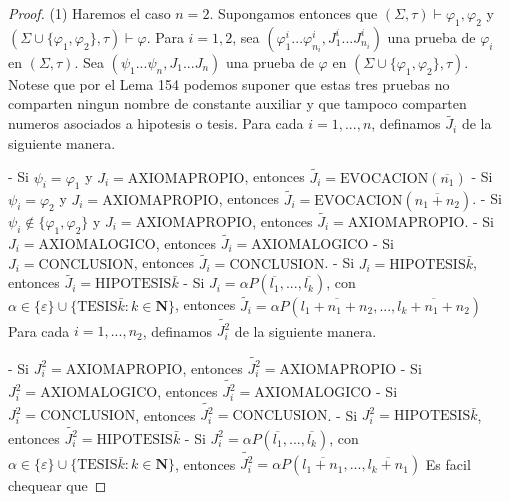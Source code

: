   \begin{proof}
    (1) Haremos el caso \(n=2.\) Supongamos entonces que \((\Sigma ,\tau )\vdash \varphi _{1},\varphi _{2}\) y \((\Sigma \cup \{\varphi _{1},\varphi _{2}\},\tau )\vdash \varphi \). Para \(i=1,2\), sea \((\varphi _{1}^{i}...\varphi _{n_{i}}^{i},J_{1}^{i}...J_{n_{i}}^{i})\) una prueba de \( \varphi _{i}\) en \((\Sigma ,\tau )\). Sea \((\psi _{1}...\psi _{n},J_{1}...J_{n})\) una prueba de \(\varphi \) en \((\Sigma \cup \{\varphi _{1},\varphi _{2}\},\tau )\). Notese que por el Lema 154 podemos suponer que estas tres pruebas no comparten ningun nombre de constante auxiliar y que tampoco comparten numeros asociados a hipotesis o tesis. Para cada \(i=1,...,n\), definamos \(\widetilde{J_{i}}\) de la siguiente manera.

    - Si \(\psi _{i}=\varphi _{1}\) y \(J_{i}=\mathrm{AXIOMAPROPIO}\), entonces \(\widetilde{J_{i}}=\mathrm{EVOCACION}(\overline{n_{1}})\)
    - Si \(\psi _{i}=\varphi _{2}\) y \(J_{i}=\mathrm{AXIOMAPROPIO}\), entonces \(\widetilde{J_{i}}=\mathrm{EVOCACION}(\overline{n_{1}+n_{2}})\).
    - Si \(\psi _{i}\notin \{\varphi _{1},\varphi _{2}\}\) y \(J_{i}=\mathrm{ AXIOMAPROPIO}\), entonces \(\widetilde{J_{i}}=\mathrm{AXIOMAPROPIO}\).
    - Si \(J_{i}=\mathrm{AXIOMALOGICO}\), entonces \(\widetilde{J_{i}}= \mathrm{AXIOMALOGICO}\)
    - Si \(J_{i}=\mathrm{CONCLUSION}\), entonces \(\widetilde{J_{i}}=\mathrm{ CONCLUSION}\).
    - Si \(J_{i}=\mathrm{HIPOTESIS}\bar{k}\), entonces \(\widetilde{J_{i}}= \mathrm{HIPOTESIS}\bar{k}\)
    - Si \(J_{i}=\alpha P(\overline{l_{1}},...,\overline{l_{k}})\), con \( \alpha \in \{\varepsilon \}\cup \{\mathrm{TESIS}\bar{k}:k\in \mathbf{N}\}\), entonces \(\widetilde{J_{i}}=\alpha P(\overline{l_{1}+n_{1}+n_{2}},..., \overline{l_{k}+n_{1}+n_{2}})\)
    Para cada \(i=1,...,n_{2}\), definamos \(\widetilde{J_{i}^{2}}\) de la siguiente manera.

    - Si \(J_{i}^{2}=\mathrm{AXIOMAPROPIO}\), entonces \(\widetilde{J_{i}^{2} }=\mathrm{AXIOMAPROPIO}\)
    - Si \(J_{i}^{2}=\mathrm{AXIOMALOGICO}\), entonces \(\widetilde{J_{i}^{2} }=\mathrm{AXIOMALOGICO}\)
    - Si \(J_{i}^{2}=\mathrm{CONCLUSION}\), entonces \(\widetilde{J_{i}^{2}}= \mathrm{CONCLUSION}\).
    - Si \(J_{i}^{2}=\mathrm{HIPOTESIS}\bar{k}\), entonces \(\widetilde{ J_{i}^{2}}=\mathrm{HIPOTESIS}\bar{k}\)
    - Si \(J_{i}^{2}=\alpha P(\overline{l_{1}},...,\overline{l_{k}})\), con \(\alpha \in \{\varepsilon \}\cup \{\mathrm{TESIS}\bar{k}:k\in \mathbf{N}\}\), entonces \(\widetilde{J_{i}^{2}}=\alpha P(\overline{l_{1}+n_{1}},..., \overline{l_{k}+n_{1}})\)
    Es facil chequear que


\end{proof}

